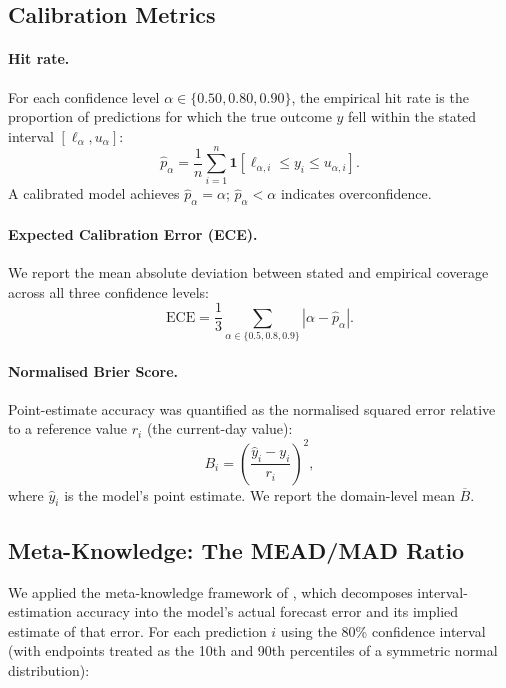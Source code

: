 \documentclass[9pt,twoside,lineno]{pnas-new}
\begin{document}
\subsection*{Calibration Metrics}

\paragraph{Hit rate.} For each confidence level $\alpha \in \{0.50, 0.80, 0.90\}$, the empirical hit rate is the proportion of predictions for which the true outcome $y$ fell within the stated interval $[\ell_\alpha, u_\alpha]$:
\begin{equation}
  \hat{p}_\alpha = \frac{1}{n}\sum_{i=1}^{n} \mathbf{1}[\ell_{\alpha,i} \le y_i \le u_{\alpha,i}].
\end{equation}
A calibrated model achieves $\hat{p}_\alpha = \alpha$; $\hat{p}_\alpha < \alpha$ indicates overconfidence.

\paragraph{Expected Calibration Error (ECE).} We report the mean absolute deviation between stated and empirical coverage across all three confidence levels:
\begin{equation}
  \text{ECE} = \frac{1}{3}\sum_{\alpha \in \{0.5, 0.8, 0.9\}} |\alpha - \hat{p}_\alpha|.
\end{equation}

\paragraph{Normalised Brier Score.} Point-estimate accuracy was quantified as the normalised squared error relative to a reference value $r_i$ (the current-day value):
\begin{equation}
  B_i = \left(\frac{\hat{y}_i - y_i}{r_i}\right)^2,
\end{equation}
where $\hat{y}_i$ is the model's point estimate. We report the domain-level mean $\overline{B}$.

\subsection*{Meta-Knowledge: The MEAD/MAD Ratio}

We applied the meta-knowledge framework of \citet{soll2004}, which decomposes interval-estimation accuracy into the model's actual forecast error and its implied estimate of that error. For each prediction $i$ using the 80\% confidence interval (with endpoints treated as the 10th and 90th percentiles of a symmetric normal distribution):
\end{document}
